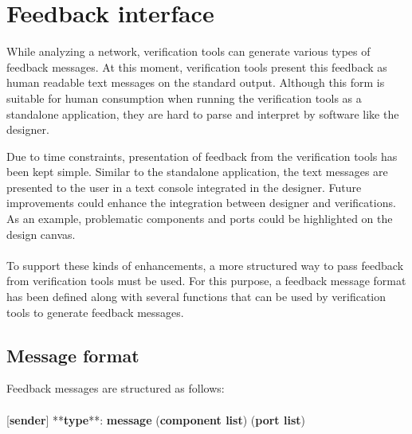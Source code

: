 \section{Feedback interface}

While analyzing a network, verification tools can generate various types of
feedback messages. At this moment, verification tools present this feedback
as human readable text messages on the standard output. Although this form
is suitable for human consumption when running the verification tools as a
standalone application, they are hard to parse and interpret by software like
the designer.

Due to time constraints, presentation of feedback from the verification
tools has been kept simple. Similar to the standalone application, the
text messages are presented to the user in a text console integrated in
the designer. Future improvements could enhance the integration between
designer and verifications. As an example, problematic components and ports
could be highlighted on the design canvas.

\paragraph{}
To support these kinds of enhancements, a more structured way to pass feedback
from verification tools must be used. For this purpose, a feedback message
format has been defined along with several functions that can be used 
by verification tools to generate feedback messages.


\subsection{Message format}
Feedback messages are structured as follows:

\paragraph{}
[\textbf{sender}] **\textbf{type}**: \textbf{message}
(\textbf{component list}) (\textbf{port list})


